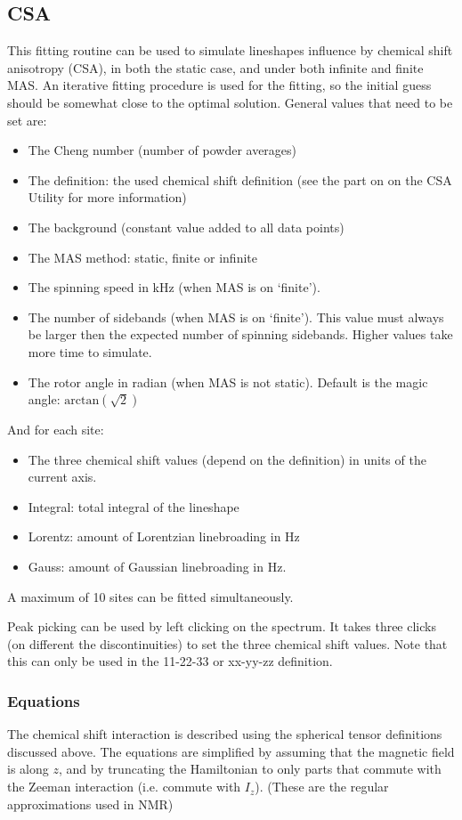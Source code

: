 \documentclass[11pt,a4paper]{article}
\begin{document}
\subsection{CSA}
This fitting routine can be used to simulate lineshapes influence by chemical shift anisotropy
(CSA), in both the static case, and under both infinite and finite MAS. An iterative fitting
procedure is used for the fitting, so the initial guess should be somewhat close to the optimal
solution. General values that need to be set are:
\begin{itemize}
\item The Cheng number (number of powder averages)
\item The definition: the used chemical shift definition (see the part on on the CSA Utility for more information)
\item The background (constant value added to all data points)
\item The MAS method: static, finite or infinite
\item The spinning speed in kHz (when MAS is on `finite').
\item The number of sidebands (when MAS is on `finite'). This value must always be larger then the
  expected number of spinning sidebands. Higher values take more time to simulate.
\item The rotor angle in radian (when MAS is not static). Default is the magic angle:
	 $\text{arctan}(\sqrt{2})$
\end{itemize}
And for each site:
\begin{itemize}
\item The three chemical shift values (depend on the definition) in units of the current axis.
\item Integral: total integral of the lineshape
\item Lorentz: amount of Lorentzian linebroading in Hz
\item Gauss: amount of Gaussian linebroading in Hz.
\end{itemize}
A maximum of 10 sites can be fitted simultaneously.

Peak picking can be used by left clicking on the spectrum. It takes three clicks (on different the
discontinuities) to set the three chemical shift values. Note that this can only be used in the 11-22-33 or
xx-yy-zz definition.


\subsubsection*{Equations}
The chemical shift interaction is described using the spherical tensor definitions discussed
above. The equations are simplified by assuming that the magnetic field is along $z$, and by
truncating the Hamiltonian to only parts that commute with the Zeeman interaction (i.e. commute
with $I_z$). (These are the regular approximations used in NMR)
\end{document}
